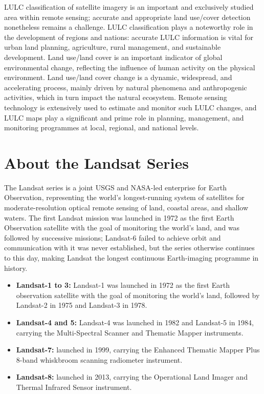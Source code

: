 \documentclass[11pt]{article}
\begin{document}
LULC classification of satellite imagery is an important and exclusively studied area within
remote sensing; accurate and appropriate land use/cover detection nonetheless remains a
challenge. LULC classification plays a noteworthy role in the development of regions and
nations: accurate LULC information is vital for urban land planning, agriculture, rural
management, and sustainable development. Land use/land cover is an important indicator of
global environmental change, reflecting the influence of human activity on the physical
environment. Land use/land cover change is a dynamic, widespread, and accelerating process,
mainly driven by natural phenomena and anthropogenic activities, which in turn impact the
natural ecosystem. Remote sensing technology is extensively used to estimate and monitor such
LULC changes, and LULC maps play a significant and prime role in planning, management, and
monitoring programmes at local, regional, and national levels.

\section{About the Landsat Series}

The Landsat series is a joint USGS and NASA-led enterprise for Earth Observation, representing
the world's longest-running system of satellites for moderate-resolution optical remote sensing
of land, coastal areas, and shallow waters. The first Landsat mission was launched in 1972 as
the first Earth Observation satellite with the goal of monitoring the world's land, and was
followed by successive missions; Landsat-6 failed to achieve orbit and communication with it was
never established, but the series otherwise continues to this day, making Landsat the longest
continuous Earth-imaging programme in history.

\begin{itemize}
  \item \textbf{Landsat-1 to 3:} Landsat-1 was launched in 1972 as the first Earth observation
  satellite with the goal of monitoring the world's land, followed by Landsat-2 in 1975 and
  Landsat-3 in 1978.
  \item \textbf{Landsat-4 and 5:} Landsat-4 was launched in 1982 and Landsat-5 in 1984, carrying
  the Multi-Spectral Scanner and Thematic Mapper instruments.
  \item \textbf{Landsat-7:} launched in 1999, carrying the Enhanced Thematic Mapper Plus 8-band
  whiskbroom scanning radiometer instrument.
  \item \textbf{Landsat-8:} launched in 2013, carrying the Operational Land Imager and Thermal
  Infrared Sensor instrument.
\end{itemize}
\end{document}
